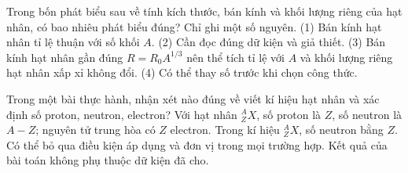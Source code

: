 \begin{ex}
Trong bốn phát biểu sau về tính kích thước, bán kính và khối lượng riêng của hạt nhân, có bao nhiêu phát biểu đúng? Chỉ ghi một số nguyên. (1) Bán kính hạt nhân tỉ lệ thuận với số khối $A$. (2) Cần đọc đúng dữ kiện và giả thiết. (3) Bán kính hạt nhân gần đúng $R=R_0A^{1/3}$ nên thể tích tỉ lệ với $A$ và khối lượng riêng hạt nhân xấp xỉ không đổi. (4) Có thể thay số trước khi chọn công thức.
\end{ex}

\begin{ex}
Trong một bài thực hành, nhận xét nào đúng về viết kí hiệu hạt nhân và xác định số proton, neutron, electron?
\choice
{\True Với hạt nhân $^{A}_{Z}X$, số proton là $Z$, số neutron là $A-Z$; nguyên tử trung hòa có $Z$ electron.}
{Trong kí hiệu $^{A}_{Z}X$, số neutron bằng $Z$.}
{Có thể bỏ qua điều kiện áp dụng và đơn vị trong mọi trường hợp.}
{Kết quả của bài toán không phụ thuộc dữ kiện đã cho.}
\end{ex}

